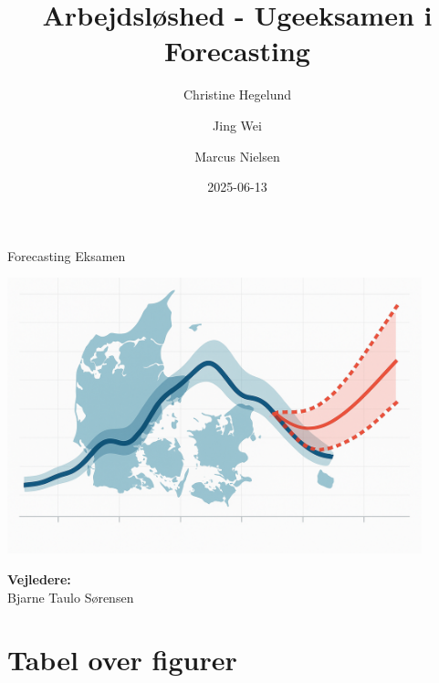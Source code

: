 \documentclass[
]{article}
\title{Arbejdsløshed - Ugeeksamen i Forecasting}
\author{Christine Hegelund \and Jing Wei \and Marcus Nielsen}
\date{2025-06-13}
\begin{document}
\maketitle


\maketitle
\thispagestyle{empty}
\begin{center}
\large{Forecasting Eksamen} \\[3em]
\end{center}
\begin{center}
\includegraphics[width=0.9\textwidth]{fotos/forside.png} \\[2em]
\end{center}
\begin{center}
\end{center}
\begin{center}
\textbf{Vejledere:} \\
Bjarne Taulo Sørensen \\
\end{center}

\newpage


\section*{Tabel over figurer}\label{tabel-over-figurer}

\thispagestyle{empty}

\newpage
\end{document}
